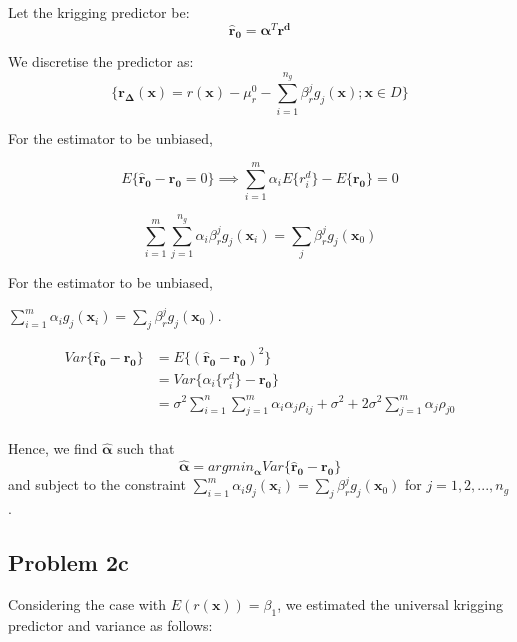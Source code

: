 \documentclass[]{article}
\newcommand{\vect}[1]{\ensuremath{\boldsymbol{\mathbf{#1}}}}
\begin{document}
Let the krigging predictor be: \[
\vect{\hat{r}_0} = \vect{\alpha}^T \vect{r^d} 
\]

We discretise the predictor as: \[
\{\vect{r_{\Delta} (x)} = r(\vect{x}) - \mu_r^0 - \sum_{i=1}^{n_g} \beta_r^j g_j(\vect{x}); \vect{x} \in  D\}
\]

For the estimator to be unbiased,

\[E\{\vect{\hat{r}_0} - \vect{{r}_0} =0 \} \implies \sum_{i=1}^m \alpha_iE\{r_i^d\} - E\{ \vect{{r}_0}\} = 0\]

\[\sum_{i=1}^m \sum_{j=1}^{n_g} \alpha_i \beta_r^j g_j(\vect{x}_i) = \sum_{j}\beta_r^j g_j(\vect{x}_0)\]

For the estimator to be unbiased,

\(\sum_{i=1}^m \alpha_i g_j(\vect{x}_i) = \sum_{j}\beta_r^j g_j(\vect{x}_0)\).

\begin{equation*}
    \begin{split}
      Var\{\vect{\hat{r}_0} - \vect{{r}_0} \} &= E\{(\vect{\hat{r}_0} - \vect{{r}_0})^2 \} \\
                                       &= Var\{\alpha_i \{r_i^d\} - \vect{{r}_0}\} \\
                                        &= \sigma^2 \sum_{i=1}^n\sum_{j=1}^m \alpha_i\alpha_j\rho_{ij} + \sigma^2 + 2 \sigma^2\sum_{j=1}^m\alpha_j\rho_{j0}\\
    \end{split}
\end{equation*}

Hence, we find \(\vect{\hat\alpha}\) such that \[
\vect{\hat\alpha} = argmin_{\vect{\alpha}} Var\{\vect{\hat{r}_0} - \vect{{r}_0} \}
\] and subject to the constraint
\(\sum_{i=1}^m \alpha_i g_j(\vect{x}_i) = \sum_{j}\beta_r^j g_j(\vect{x}_0)\)
for \(j= 1,2,...,n_g\).

\hypertarget{problem-2c}{%
\subsection{Problem 2c}\label{problem-2c}}

Considering the case with \(E(r(\vect x)) = \beta_1\), we estimated the
universal krigging predictor and variance as follows:
\end{document}
